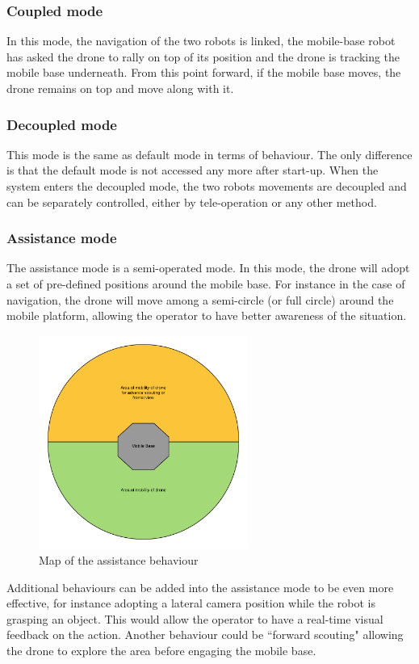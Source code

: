 \documentclass[11pt,a4paper,twocolumn]{article}
\begin{document}
\subsubsection{Coupled mode}
In this mode, the navigation of the two robots is linked, the mobile-base robot has asked the drone to 
rally on top of its position and the drone is tracking the mobile base underneath. From this point forward, if the mobile base moves, the drone remains on top and move along with it.

\subsubsection{Decoupled mode}
This mode is the same as default mode in terms of behaviour. The only difference is that the default mode
is not accessed any more after start-up. When the system enters the decoupled mode, the two robots movements
are decoupled and can be separately controlled, either by tele-operation or any other method.

\subsubsection{Assistance mode}
The assistance mode is a semi-operated mode. In this mode, the drone will adopt a set of pre-defined
positions around the mobile base. For instance in the case of navigation, the drone will move 
among a semi-circle (or full circle) around the mobile platform, allowing the 
operator to have better awareness of the situation.

\begin{figure}[ht]	
\centering
\includegraphics[height=7cm]{assistanceBehavior.png}
\caption{Map of the assistance behaviour}
\end{figure}

Additional behaviours can be added into the assistance mode to be even more effective, for
instance adopting a lateral camera position while the robot is grasping an object. This would
allow the operator to have a real-time visual feedback on the action. Another behaviour
could be ``forward scouting" allowing the drone to explore the area before engaging the 
mobile base.
\end{document}
